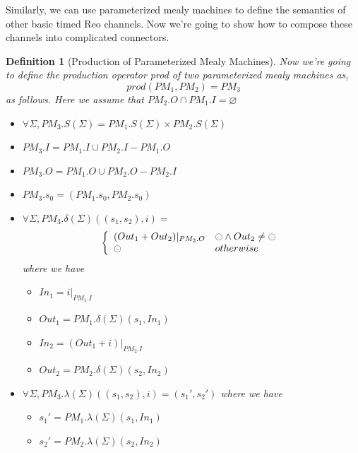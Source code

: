 \documentclass[conference, a4paper]{IEEEtran}
\newtheorem{definition}{Definition}
\newcommand{\rblock}[0]{\circleddash}
\begin{document}
Similarly, we can use parameterized mealy machines to define the semantics of other basic timed Reo
channels. Now we're going to show how to compose these channels into complicated connectors.

\begin{definition}[Production of Parameterized Mealy Machines]
  Now we're going to define the production operator \emph{prod} of two parameterized mealy machines as,
  \[
  prod(PM_1,PM_2)=PM_3
  \]
  as follows. Here we assume that $PM_2.O\cap PM_1.I=\varnothing$
  \begin{itemize}
  	\item[-] $\forall\Sigma, PM_3.S(\Sigma)=PM_1.S(\Sigma)\times PM_2.S(\Sigma)$
    \item[-] $PM_3.I=PM_1.I\cup PM_2.I-PM_1.O$
    \item[-] $PM_3.O=PM_1.O\cup PM_2.O-PM_2.I$
    \item[-] $PM_3.s_0=(PM_1.s_0, PM_2.s_0)$
    \item[-] $\forall\Sigma, PM_3.\delta(\Sigma)((s_1,s_2), i)=$
      \begin{displaymath}
        \left\{
        \begin{array}[h]{ll}
          (Out_1 + Out_2)|_{PM_3.O} & \rblock\land Out_2\neq\rblock \\
          \rblock & otherwise \\
        \end{array}
        \right.
      \end{displaymath}
      where we have
      \begin{itemize}
        \item[*] $In_1 = i|_{PM_1.I}$
        \item[*] $Out_1 = PM_1.\delta(\Sigma)(s_1,In_1)$
        \item[*] $In_2 = (Out_1 + i)|_{PM_2.I}$
        \item[*] $Out_2 = PM_2.\delta(\Sigma)(s_2,In_2)$
      \end{itemize}
    \item[-] $\forall\Sigma, PM_3.\lambda(\Sigma)((s_1,s_2),i)=(s_1',s_2')$
      where we have
      \begin{itemize}
        \item[*] $s_1' = PM_1.\lambda(\Sigma)(s_1,In_1)$
        \item[*] $s_2' = PM_2.\lambda(\Sigma)(s_2,In_2)$
      \end{itemize}
  \end{itemize}
\end{definition}
\end{document}
